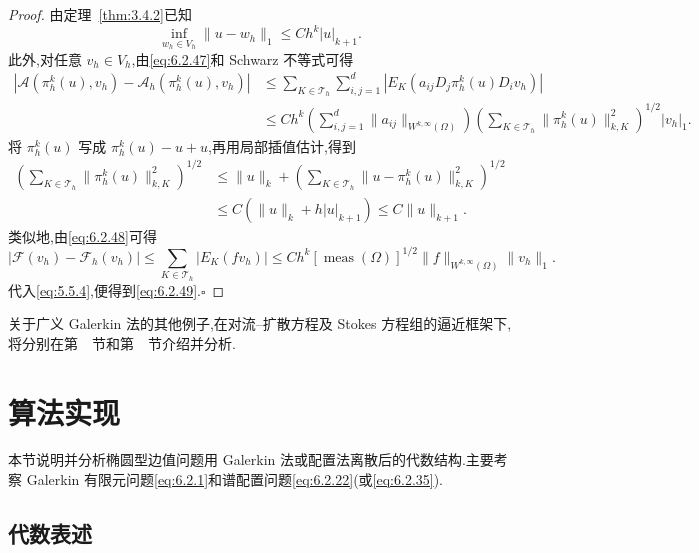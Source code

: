 \begin{proof}
由定理~\ref{thm:3.4.2}已知
\[
  \inf_{w_h\in V_h}\|u-w_h\|_1\le Ch^k|u|_{k+1}.
\]
此外,对任意 \(v_h\in V_h\),由\eqref{eq:6.2.47}和 Schwarz 不等式可得
\[
  \begin{aligned}
   |\mathcal A(\pi_h^k(u),v_h)-\mathcal A_h(\pi_h^k(u),v_h)|
   &\le\sum_{K\in\mathcal T_h}\sum_{i,j=1}^d|E_K(a_{ij}D_j\pi_h^k(u)D_iv_h)|\\
   &\le Ch^k\left(\sum_{i,j=1}^d\|a_{ij}\|_{W^{k,\infty}(\Omega)}\right)
    \left(\sum_{K\in\mathcal T_h}\|\pi_h^k(u)\|_{k,K}^2\right)^{1/2}|v_h|_1.
  \end{aligned}
\]
将 \(\pi_h^k(u)\) 写成 \(\pi_h^k(u)-u+u\),再用局部插值估计,得到
\[
  \begin{aligned}
    \left(\sum_{K\in\mathcal T_h}\|\pi_h^k(u)\|_{k,K}^2\right)^{1/2}
    &\le \|u\|_k+
        \left(\sum_{K\in\mathcal T_h}\|u-\pi_h^k(u)\|_{k,K}^2\right)^{1/2}\\
    &\le C(\|u\|_k+h|u|_{k+1})\le C\|u\|_{k+1}.
  \end{aligned}
\]
类似地,由\eqref{eq:6.2.48}可得
\[
  |\mathcal F(v_h)-\mathcal F_h(v_h)|
  \le\sum_{K\in\mathcal T_h}|E_K(fv_h)|
  \le Ch^k[\operatorname{meas}(\Omega)]^{1/2}\|f\|_{W^{k,\infty}(\Omega)}\|v_h\|_1.
\]
代入\eqref{eq:5.5.4},便得到\eqref{eq:6.2.49}.\hfill\(\square\)
\end{proof}

关于广义 Galerkin 法的其他例子,在对流--扩散方程及 Stokes 方程组的逼近框架下,将分别在第~~节和第~~节介绍并分析.

\section{算法实现}\label{sec:6.3}

本节说明并分析椭圆型边值问题用 Galerkin 法或配置法离散后的代数结构.主要考察 Galerkin 有限元问题\eqref{eq:6.2.1}和谱配置问题\eqref{eq:6.2.22}(或\eqref{eq:6.2.35}).
\subsection{代数表述}\label{sec:6.3.1}

